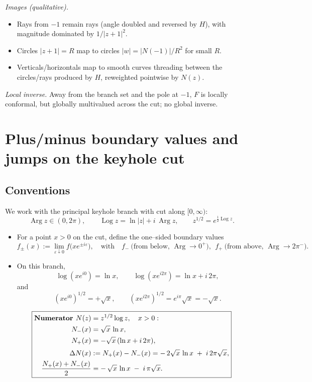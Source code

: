 \documentclass[12pt,a4paper]{article}
\DeclareMathOperator{\Arg}{Arg}
\DeclareMathOperator{\Log}{Log}
\begin{document}
\emph{Images (qualitative).}
\begin{itemize}
\item Rays from \(-1\) remain rays (angle doubled and reversed by \(H\)), with magnitude dominated by \(1/|z+1|^2\).
\item Circles \(|z+1|=R\) map to circles \(|w|=|N(-1)|/R^2\) for small \(R\).
\item Verticals/horizontals map to smooth curves threading between the circles/rays produced by \(H\), reweighted pointwise by \(N(z)\).
\end{itemize}

\emph{Local inverse.}
Away from the branch set and the pole at \(-1\), \(F\) is locally conformal, but globally multivalued across the cut; no global inverse.

\section*{Plus/minus boundary values and jumps on the keyhole cut}



\subsection*{Conventions}

We work with the principal keyhole branch with cut along $[0,\infty)$:
\[
\Arg z\in(0,2\pi),\qquad \Log z=\ln|z|+i\,\Arg z,\qquad
z^{1/2}=e^{\frac12\Log z}.
\]

\begin{itemize}
\item For a point $x>0$ on the cut, define the one–sided boundary values
\[
f_{\pm}(x):=\lim_{\varepsilon\downarrow0} f\bigl(xe^{\pm i\varepsilon}\bigr),
\quad\text{with}\quad
f_{-}\ \text{(from below, }\Arg\to0^+),\ \ 
f_{+}\ \text{(from above, }\Arg\to2\pi^-).
\]

\item On this branch,
\[
\log(xe^{i0})=\ln x,\qquad
\log(xe^{i2\pi})=\ln x+i\,2\pi,
\]
and
\[
(xe^{i0})^{1/2}=+\sqrt{x},\qquad
(xe^{i2\pi})^{1/2}=e^{i\pi}\sqrt{x}=-\sqrt{x}.
\]
\end{itemize}

\bigskip

\[
\boxed{%
\begin{aligned}
\textbf{Numerator } N(z)&=z^{1/2}\log z, \quad x>0: \\
N_-(x)&=\sqrt{x}\,\ln x,\\
N_+(x)&=-\sqrt{x}\,(\ln x+i\,2\pi),\\[2pt]
\Delta N(x)&:=N_+(x)-N_-(x)=-\,2\sqrt{x}\,\ln x\;+\;i\,2\pi\sqrt{x},\\
\frac{N_+(x)+N_-(x)}{2}&=-\,\sqrt{x}\,\ln x\;-\;i\,\pi\sqrt{x}.
\end{aligned}}
\]
\end{document}
